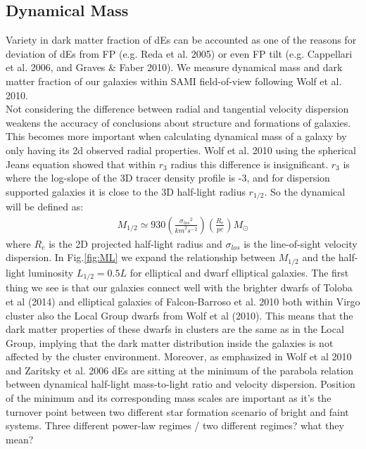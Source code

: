 \documentclass{aa}
\begin{document}
\subsection{Dynamical Mass}
Variety in dark matter fraction of dEs can be accounted as one of the reasons for deviation of dEs from FP (e.g. Reda et al. 2005) or even FP tilt (e.g. Cappellari et al. 2006, and Graves \& Faber 2010). We measure dynamical mass and dark matter fraction of our galaxies within SAMI field-of-view following Wolf et al. 2010. \\Not considering the difference between radial and tangential velocity dispersion weakens the accuracy of conclusions about structure and formations of galaxies. This becomes more important when calculating dynamical mass of a galaxy by only having its 2d observed radial properties. Wolf et al. 2010 using the spherical Jeans equation showed that within $r_3$ radius this difference is insignificant. $r_3$ is where the log-slope of the 3D tracer density profile is -3, and for dispersion supported galaxies it is close to the 3D half-light radius $r_{1/2}$. So the dynamical will be defined as:
\begin{eqnarray}
	M_{1/2}\simeq930(\frac{{\sigma_{los}}^2}{{km}^2s^{-2}})(\frac{R_e}{pc})M_{\odot}
\end{eqnarray}
where $R_e$ is the 2D projected half-light radius and $\sigma_{los}$ is the line-of-sight velocity dispersion. In Fig.\ref{fig:ML} we expand the relationship between $M_{1/2}$ and the half-light luminosity $L_{1/2}=0.5L$ for elliptical and dwarf elliptical galaxies. The first thing we see is that our galaxies connect well with the brighter dwarfs of Toloba et al (2014) and elliptical galaxies of Falcon-Barroso et al. 2010 both within Virgo cluster also the Local Group dwarfs from Wolf et al (2010). This means that the dark matter properties of these dwarfs in clusters are the same as in the Local Group, implying that the dark matter distribution inside the galaxies is not affected by the cluster environment. Moreover, as emphasized in Wolf et al 2010 and Zaritsky et al. 2006 dEs are sitting at the minimum of the parabola relation between dynamical half-light mass-to-light ratio and velocity dispersion. Position of the minimum and its corresponding mass scales are important as it's the turnover point between two different star formation scenario of bright and faint systems. Three different power-law regimes / two different regimes? what they mean? 
\end{document}
